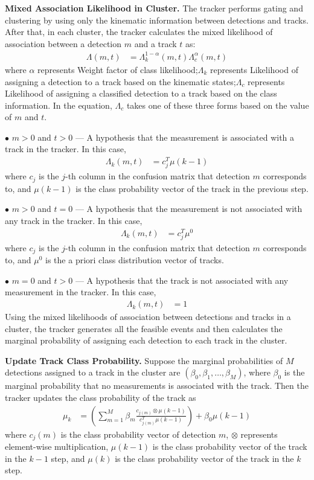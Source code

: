 \textbf{Mixed Association Likelihood in Cluster.}
The tracker performs gating and clustering by using only the kinematic information between detections and tracks. 
After that, in each cluster, the tracker calculates the mixed likelihood of association between a detection $m$ and a track $t$ as:
\begin{align}
	\Lambda(m, t) & = \Lambda_{k}^{1-\alpha}(m, t) \Lambda_{c}^{\alpha}(m, t)
\end{align}
where $\alpha$ represents Weight factor of class likelihood;$\Lambda_{k}$ represents Likelihood of assigning a detection to a track based on the kinematic states;$\Lambda_{c}$ represents Likelihood of assigning a classified detection to a track based on the class information.
In the equation, $\Lambda_{c}$ takes one of these three forms based on the value of $m$ and $t$.

$\bullet$ $m > 0$ and $t > 0$ — A hypothesis that the measurement is associated with a track in the tracker. 
In this case,
\begin{align}
	\Lambda_{k}(m, t) & = c_{j}^{T} \mu(k-1)
\end{align}
where $c_{j}$ is the $j$-th column in the confusion matrix that detection $m$ corresponds to, and $\mu(k-1)$ is the class probability vector of the track in the previous step.

$\bullet$ $m > 0$ and $t = 0$ — A hypothesis that the measurement is not associated with any track in the tracker. In this case,
\begin{align}
	\Lambda_{k}(m, t) & = c_{j}^{T} \mu^{0}
\end{align}
where $c_{j}$ is the $j$-th column in the confusion matrix that detection $m$ corresponds to, and $\mu^{0}$ is the a priori class distribution vector of tracks.

$\bullet$ $m = 0$ and $t > 0$ — A hypothesis that the track is not associated with any measurement in the tracker. In this case,
\begin{align}
	\Lambda_{k}(m, t) & = 1
\end{align}
Using the mixed likelihoods of association between detections and tracks in a cluster, the tracker generates all the feasible events and then calculates the marginal probability of assigning each detection to each track in the cluster.

\textbf{Update Track Class Probability.}
Suppose the marginal probabilities of $M$ detections assigned to a track in the cluster are $\left(\beta_{0}, \beta_{1}, \ldots, \beta_{M}\right)$, where $\beta_{0}$ is the marginal probability that no measurements is associated with the track. 
Then the tracker updates the class probability of the track as
\begin{align}
	\mu_{k} & = \left(\sum_{m = 1}^{M} \beta_{m} \frac{c_{j(m)} \otimes \mu(k-1)}{c_{j(m)}^{T} \mu(k-1)}\right)+\beta_{0} \mu(k-1)
\end{align}
where $c_{j}(m)$ is the class probability vector of detection $m$, $\otimes$ represents element-wise multiplication, $\mu(k-1)$ is the class probability vector of the track in the $k-1$ step, and $\mu(k)$ is the class probability vector of the track in the $k$ step.

